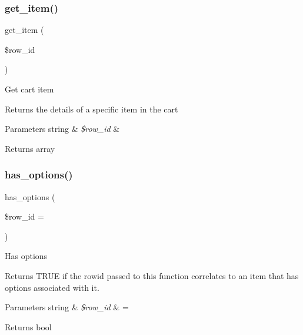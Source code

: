 \subsubsection{\texorpdfstring{get\+\_\+item()}{get\_item()}}
{\footnotesize\ttfamily get\+\_\+item (\begin{DoxyParamCaption}\item[{}]{\$row\+\_\+id }\end{DoxyParamCaption})}

Get cart item

Returns the details of a specific item in the cart


\begin{DoxyParams}[1]{Parameters}
string & {\em \$row\+\_\+id} & \\
\hline
\end{DoxyParams}
\begin{DoxyReturn}{Returns}
array 
\end{DoxyReturn}
\mbox{\label{class_c_i___cart_a276cedf02c823357a2b643a13806f2be}} 
\subsubsection{\texorpdfstring{has\+\_\+options()}{has\_options()}}
{\footnotesize\ttfamily has\+\_\+options (\begin{DoxyParamCaption}\item[{}]{\$row\+\_\+id = {\ttfamily \textquotesingle{}\textquotesingle{}} }\end{DoxyParamCaption})}

Has options

Returns T\+R\+UE if the rowid passed to this function correlates to an item that has options associated with it.


\begin{DoxyParams}[1]{Parameters}
string & {\em \$row\+\_\+id} & = \textquotesingle{}\textquotesingle{} \\
\hline
\end{DoxyParams}
\begin{DoxyReturn}{Returns}
bool 
\end{DoxyReturn}
\mbox{\label{class_c_i___cart_a07488e002c513013079157a9fe61a8e3}} 
